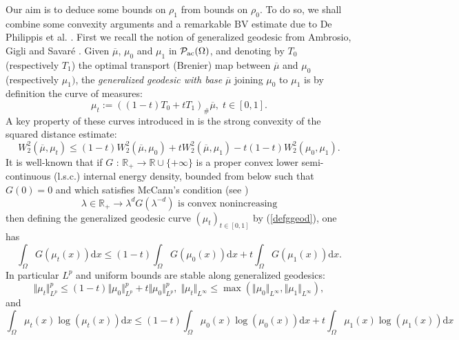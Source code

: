 \documentclass[12pt, a4paper]{article}
\numberwithin{equation}{section}
\theoremstyle{plain}
\theoremstyle{definition}
\theoremstyle{remark}
\newcommand\PPa{{\cal P}_{\rm{ac}}(\Omega)}
\newcommand{\R}{\mathbb{R}}
\newcommand{\BV}{\mathrm{BV}}
\newcommand{\ovmu}{\overline{\mu}}
\newcommand\pref[1]{(\ref{#1})}
\begin{document}
Our aim is to deduce some bounds on $\rho_1$ from bounds on $\rho_0$. To do so, we shall combine some convexity arguments and a remarkable $\BV$ estimate due to De Philippis et al. \cite{de2016bv}. First we recall the notion of generalized geodesic from Ambrosio, Gigli and Savar\'e \cite{ambrosio2008gradient}. Given $\ovmu$, $\mu_0$ and $\mu_1$ in $\PPa$, and denoting by $T_0$ (respectively $T_1$) the optimal transport (Brenier) map between $\ovmu$ and $\mu_0$ (respectively $\mu_1)$, the \emph{generalized geodesic with base}  $\ovmu$ joining $\mu_0$ to $\mu_1$ is by definition the curve of measures:
\begin{equation}\label{defggeod}
\mu_t:=((1-t) T_0 +t T_1)_\# \ovmu, \; t\in [0,1]. 
\end{equation}
A key property of these curves introduced in \cite{ambrosio2008gradient} is the strong convexity of the squared distance estimate:
\begin{equation}\label{contw2}
W_2^2(\ovmu, \mu_t) \le (1-t) W_2^2(\ovmu, \mu_0)+ t  W_2^2(\ovmu, \mu_1)-t(1-t)  W_2^2( \mu_0, \mu_1).
\end{equation}
It is well-known that if $G$ : $\R_+\to \R \cup\{+\infty\}$ is a proper convex lower semi-continuous (l.s.c.) internal energy density, bounded from below such that $G(0)=0$ and which satisfies McCann's condition (see \cite{mcc97}) 
\begin{equation}\label{mccond}
\lambda \in \R_+ \to \lambda^d G(\lambda^{-d}) \mbox{ is convex nonincreasing}
\end{equation}
then defining the generalized geodesic curve $(\mu_t)_{t\in [0, 1]}$ by \pref{defggeod}, one has
\begin{equation}\label{geodconvex}
\int_{\Omega} G(\mu_t(x)) \mbox{d}x \le (1-t) \int_{\Omega} G(\mu_0(x)) \mbox{d} x+ t \int_{\Omega} G(\mu_1(x)) \mbox{d} x.
\end{equation}
In particular $L^p$ and uniform bounds are stable along generalized  geodesics:
\begin{equation}\label{boundsconvex}
\Vert \mu_t \Vert_{L^p}^p \le (1-t) \Vert \mu_0\Vert_{L^p}^p+ t \Vert \mu_0\Vert_{L^p}^p, \; \Vert \mu_t\Vert_{L^\infty} \le \max (\Vert \mu_0 \Vert_{L^\infty}, \Vert \mu_1\Vert_{L^\infty}),
\end{equation}
and 
\begin{equation}\label{entropybound}
\int_{\Omega} \mu_t(x)  \log(\mu_t(x)) \mbox{d}x \le (1-t) \int_{\Omega}  \mu_0(x) \log(\mu_0(x)) \mbox{d}x + t \int_{\Omega}  \mu_1(x) \log(\mu_1(x)) \mbox{d}x 
\end{equation}
\end{document}
